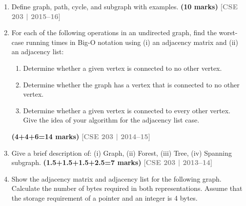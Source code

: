 \documentclass[12pt,a3paper]{article}
\newcommand{\yr}[1]{\hfill\textcolor{gray}{\small\textbf{[#1]}}}
\newcommand{\mk}[1]{\textcolor{orange!70!black}{\small\textbf{(#1 marks)}}}
\begin{document}
\begin{enumerate}

\item Define graph, path, cycle, and subgraph with examples. \mk{10}
\yr{CSE 203 | 2015--16}

\item For each of the following operations in an undirected graph, find the worst-case running times in Big-O notation using (i) an adjacency matrix and (ii) an adjacency list:
\begin{enumerate}
  \item Determine whether a given vertex is connected to no other vertex.
  \item Determine whether the graph has a vertex that is connected to no other vertex.
  \item Determine whether a given vertex is connected to every other vertex. Give the idea of your algorithm for the adjacency list case.
\end{enumerate}
\mk{4+4+6=14}
\yr{CSE 203 | 2014--15}

\item Give a brief description of: (i) Graph, (ii) Forest, (iii) Tree, (iv) Spanning subgraph. \mk{1.5+1.5+1.5+2.5=7}
\yr{CSE 203 | 2013--14}

\item Show the adjacency matrix and adjacency list for the following graph.
Calculate the number of bytes required in both representations. Assume that the
storage requirement of a pointer and an integer is 4 bytes.

\begin{figure}[h]
  \centering
  \begin{tikzpicture}[
    every node/.style={circle, draw, minimum size=0.9cm, font=\bfseries},
    edge label/.style={rectangle, draw=none, font=\normalfont\small},
    node distance=2.5cm
  ]


\end{tikzpicture}
\end{figure}
\end{enumerate}
\end{document}
